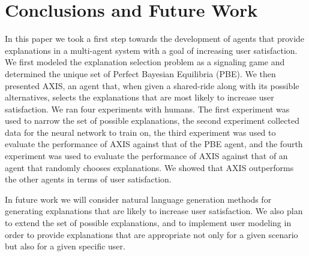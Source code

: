 \documentclass[letterpaper]{article} %
\begin{document}
\section{Conclusions and Future Work}

In this paper we took a first step towards the development of agents that provide explanations in a multi-agent system with a goal of increasing user satisfaction.
We first modeled the explanation selection problem as a signaling game and determined the unique set of Perfect Bayesian Equilibria (PBE). We then presented AXIS, an agent that, when given a shared-ride along with its possible alternatives, selects the explanations that are most likely to increase user satisfaction.
We ran four experiments with humans. The first experiment was used to narrow the set of possible explanations, the second experiment collected data for the neural network to train on, the third experiment was used to evaluate the performance of AXIS against that of the PBE agent, and the fourth experiment was used to evaluate the performance of AXIS against that of an agent that randomly chooses explanations. We showed that AXIS outperforms the other agents in terms of user satisfaction.

In future work we will consider natural language generation methods for generating explanations that are likely to increase user satisfaction. We also plan to extend the set of possible explanations, and to implement user modeling in order to provide explanations that are appropriate not only for a given scenario but also for a given specific user.



\end{document}

